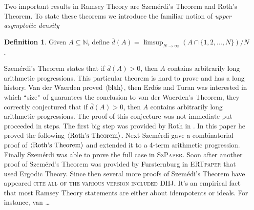 \documentclass[12pt]{article}
\theoremstyle{plain}
\theoremstyle{definition}
\newtheorem{defn}[thm]{Definition}
\newcommand{\bbN}{\mathbb{N}}
\newcommand{\la}{\langle}
\newcommand{\ra}{\rangle}
\begin{document}
Two important results in Ramsey Theory are Szem\'{e}rdi's Theorem and
Roth's Theorem. 
To state these theorems we introduce the familiar notion of \textsl{upper
asymptotic density}
  \begin{defn}
    Given $A \subseteq \bbN$, define $\overline{d}(A) = \limsup_{N \to
      \infty} (A \cap \{1, 2, \ldots, N\})/ N$.
  \end{defn}
Szem\'{e}rdi's Theorem states that if $\overline{d}(A) > 0$, then $A$
contains arbitrarily long arithmetic progressions. 
This particular theorem is hard to prove and has a long history. 
Van der Waerden proved $\la\hbox{blah}\ra$, then Erd\H{o}s and Turan
was interested in which ``size'' of guarantees the conclusion to van
der Waerden's Theorem, they correctly conjectured that if
$\overline{d}(A) >0$, then $A$ contains arbitrarily long arithmetic
progressions. 
The proof of this conjecture was not immediate put proceeded in
steps. 
The first big step was provided by Roth in \cite{Roth:1953fk}. 
In this paper he proved the following $\la\hbox{Roth's Theorem}\ra$.
Next Szem\'{e}rdi gave a combinatorial proof of $\la\hbox{Roth's
  Theorem}\ra$ and extended it to a 4-term arithmetic progression. 
Finally Szem\'{e}rdi was able to prove the full case in
\textsc{SzPaper}. 
Soon after another proof of Szem\'{e}rd's Theorem was provided by
Fursternburg in \textsc{ERTpaper} that used Ergodic Theory. 
Since then several more proofs of Szem\'{e}di's Theorem have appeared
\textsc{cite all of the various version included DHJ}. 
It's an empirical fact that most Ramsey Theory statements are either
about idempotents or ideals.
For instance, van \dots




\end{document}
